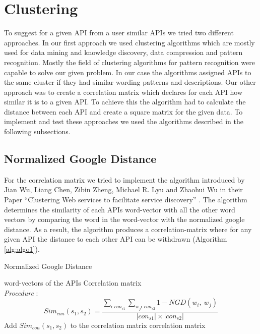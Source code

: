 \documentclass[a4paper]{IEEEtran}
\begin{document}
\section{Clustering}
\label{sec:clustering}
To suggest for a given API from a user similar APIs we tried two different approaches. In our first approach we used clustering algorithms which are mostly used for data mining and knowledge discovery, data compression and pattern recognition. Mostly the field of clustering algorithms for pattern recognition were capable to solve our given problem. In our case the algorithms assigned APIs to the same cluster if they had similar wording patterns and descriptions. 
Our other approach was to create a correlation matrix which declares for each API how similar it is to a given API. To achieve this the algorithm had to calculate the distance between each API and create a square matrix for the given data.
To implement and test these approaches we used the algorithms described in the following subsections.

\subsection{Normalized Google Distance}
For the correlation matrix we tried to implement the algorithm introduced by Jian Wu, Liang Chen, Zibin Zheng, Michael R. Lyu and Zhaohui Wu in their Paper “Clustering Web services to facilitate service discovery” \cite{kanungo2002efficient}. The algorithm determines the similarity of each APIs word-vector with all the other word vectors by comparing the word in the word-vector with the normalized google distance. As a result, the algorithm produces a correlation-matrix where for any given API the distance to each other API can be withdrawn (Algorithm \ref{alg:algo1}).

\begin{algorithm}[H]
 \caption{Normalized Google Distance}
 \label{alg:algo1}
 \begin{algorithmic}[1]
\renewcommand{\algorithmicrequire}{\textbf{Input:}}
 \renewcommand{\algorithmicensure}{\textbf{Output:}}
 \REQUIRE word-vectors of the APIs
 \ENSURE  Correlation matrix
 \\ \textit{Procedure} :
\STATE \begin{equation*}{Sim}_{con}\left(s_1,s_2\right)=\frac{\sum_{\epsilon\ {con}_{s1}}\sum_{w_j\epsilon\ {con}_{s2}}{1-NGD(w_i,\ w_j)}}{\left|{con}_{s1}\right|\times\left|{con}_{s2}\right|} \end{equation*}
 \STATE Add ${Sim}_{con}\left(s_1,s_2\right)$ to the correlation matrix 
\ENDFOR
\ENDFOR
\RETURN correlation matrix

 \end{algorithmic}
 \end{algorithm}
\end{document}
